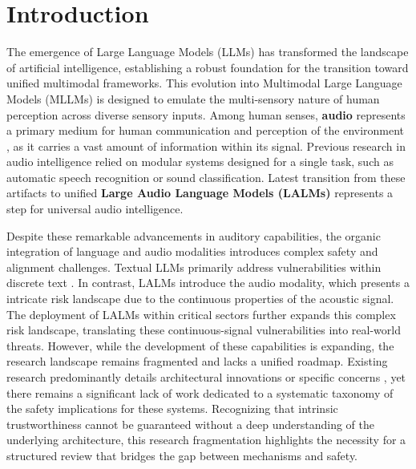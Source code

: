\section{Introduction}

The emergence of Large Language Models (LLMs) \cite {ouyang2022training, achiam2023gpt,touvron2023llama, bai2023qwen, liu2024deepseek, guo2025deepseek} has transformed the landscape of artificial intelligence, establishing a robust foundation for the transition toward unified multimodal frameworks. This evolution into Multimodal Large Language Models (MLLMs) \cite{yan2025position, yan2025survey, team2026qwen3} is designed to emulate the multi-sensory nature of human perception across diverse sensory inputs. Among human senses, \textbf{audio} represents a primary medium for human communication and perception of the environment \cite{latif2023sparks}, as it carries a vast amount of information within its signal. Previous research in audio intelligence relied on modular systems designed for a single task, such as automatic speech recognition\cite{wang2026audio, shi2026qwen3} or sound classification\cite{gemmeke2017audio, kong2020panns}. Latest transition from these artifacts to unified \textbf{Large Audio Language Models (LALMs)} \cite{chu2023qwen, tang2023salmonn, rubenstein2023audiopalm, chu2024qwen2, wu2025step} represents a step for universal audio intelligence.

Despite these remarkable advancements in auditory capabilities, the organic integration of language and audio modalities introduces complex safety and alignment challenges. Textual LLMs primarily address vulnerabilities within discrete text \cite{shi2024large, wang2025comprehensive, yu2025survey, ma2026safety}. In contrast, LALMs introduce the audio modality, which presents a intricate risk landscape \cite{lin2025hidden, chen2025synthetic, aloufi2026evaluation, chen2026hijacking} due to the continuous properties of the acoustic signal. The deployment of LALMs within critical sectors further expands this complex risk landscape, translating these continuous-signal vulnerabilities into real-world threats. However, while the development of these capabilities is expanding, the research landscape remains fragmented and lacks a unified roadmap. Existing research predominantly details architectural innovations \cite{sakshi2025spur, alex2025pal, you2026world} or specific concerns \cite{luong2025llamapartialspoof, li2025dfallm, nguyen2026analyzing}, yet there remains a significant lack of work dedicated to a systematic taxonomy of the safety implications for these systems. Recognizing that intrinsic trustworthiness cannot be guaranteed without a deep understanding of the underlying architecture, this research fragmentation highlights the necessity for a structured review that bridges the gap between mechanisms and safety.

